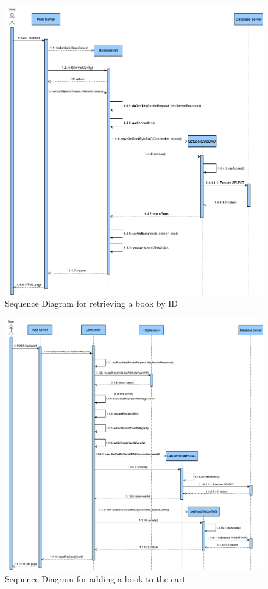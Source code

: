 \clearpage
\begin{figure}[h!]
    \centering
    \includegraphics[width=\textwidth]{photos/SequenceDiagram.png}
    \caption{Sequence Diagram for retrieving a book by ID}
    \label{fig:sequencediagram}
\end{figure}


\clearpage
\begin{figure}[h!]
    \centering
    \includegraphics[width=\textwidth]{photos/SequenceDiagram_CartServlet_AddBookToCart.png}
    \caption{Sequence Diagram for adding a book to the cart}
    \label{fig:addtocartsequencediagram}
\end{figure}


